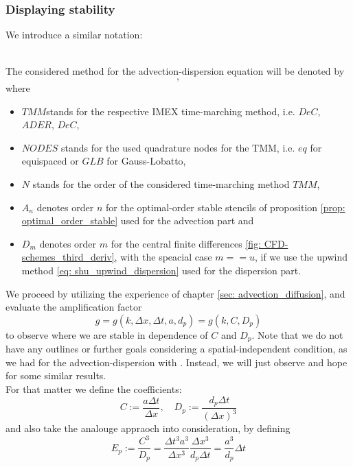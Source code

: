 \subsubsection{Displaying stability}
We introduce a similar notation:
\begin{definition}\mbox{}\\
	The considered method for the advection-dispersion equation will be denoted by
	\begin{equation*}
	[TMM,NODES,N, A_n,D_n],
	\end{equation*}
	where
	\begin{itemize}
		\item $TMM$stands for the respective IMEX time-marching method, i.e. $DeC$, $ADER$, $DeC$,
		\item $NODES$ stands for the used quadrature nodes for the TMM, i.e. $eq$ for equispaced or $GLB$ for Gauss-Lobatto,
		\item $N$ stands for the order of the considered time-marching method $TMM$,
		\item $A_n$ denotes order $n$ for the optimal-order stable stencils of proposition \ref{prop: optimal_order_stable} used for the advection part and
		\item $D_m$ denotes order $m$ for the central finite differences \ref{fig: CFD-schemes_third_deriv}, with the speacial case $m==u$, if we use the upwind method \ref{eq: shu_upwind_dispersion} used for the dispersion part.
	\end{itemize}
\end{definition}
We proceed by utilizing the experience of chapter \ref{sec: advection_diffusion}, and evaluate the amplification factor 
\begin{equation*}
g=g(k,\Delta x, \Delta t, a, d_p)=g(k,C,D_p)
\end{equation*}
to observe where we are stable in dependence of $C$ and $D_p$. Note that we do not have any outlines or further goals considering a spatial-independent condition, as we had for the advection-dispersion with \cite{TanChenShu_ImEx_Stability}. Instead, we will just observe and hope for some similar results.\\
For that matter we define the coefficients:
\begin{equation*}
C:= \frac{a\Delta t}{\Delta x}, \quad D_p := \frac{d_p \Delta t}{(\Delta x)^3}
\end{equation*}
and also take the analouge appraoch into consideration, by defining
\begin{equation*}
E_p:=\frac{C^3}{D_p}=\frac{\Delta t^3a^3}{\Delta x^3}\frac{\Delta x^3}{d_p\Delta t}=\frac{a^3}{d_p}\Delta t
\end{equation*}
